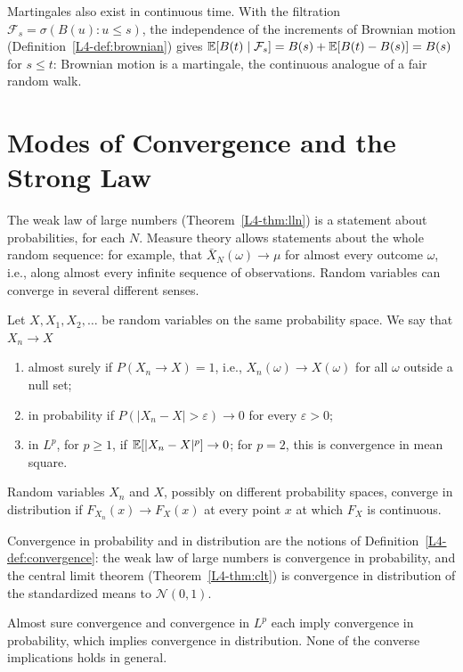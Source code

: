 Martingales also exist in continuous time. With the filtration $\mathcal{F}_s = \sigma(B(u) : u \leq s)$, the independence of the increments of Brownian motion (Definition~\ref{L4-def:brownian}) gives $\mathbb{E}[B(t) \mid \mathcal{F}_s] = B(s) + \mathbb{E}[B(t) - B(s)] = B(s)$ for $s \leq t$: Brownian motion is a martingale, the continuous analogue of a fair random walk.

\section{Modes of Convergence and the Strong Law}\label{B-sec:convergence}

The weak law of large numbers (Theorem~\ref{L4-thm:lln}) is a statement about probabilities, for each $N$. Measure theory allows statements about the whole random sequence: for example, that $\bar X_N(\omega) \to \mu$ for almost every outcome $\omega$, i.e., along almost every infinite sequence of observations. Random variables can converge in several different senses.

\begin{definition}\label{B-def:convergence-modes}
    Let $X, X_1, X_2, \ldots$ be random variables on the same probability space. We say that $X_n \to X$
    \begin{enumerate}
        \item almost surely if $P(X_n \to X) = 1$, i.e., $X_n(\omega) \to X(\omega)$ for all $\omega$ outside a null set;
        \item in probability if $P(|X_n - X| > \varepsilon) \to 0$ for every $\varepsilon > 0$;
        \item in $L^p$, for $p \geq 1$, if $\mathbb{E}[|X_n - X|^p] \to 0$; for $p = 2$, this is convergence in mean square.
    \end{enumerate}
    Random variables $X_n$ and $X$, possibly on different probability spaces, converge in distribution if $F_{X_n}(x) \to F_X(x)$ at every point $x$ at which $F_X$ is continuous.
\end{definition}

Convergence in probability and in distribution are the notions of Definition~\ref{L4-def:convergence}: the weak law of large numbers is convergence in probability, and the central limit theorem (Theorem~\ref{L4-thm:clt}) is convergence in distribution of the standardized means to $\mathcal{N}(0, 1)$.

\begin{proposition}\label{B-prop:convergence-modes}
    Almost sure convergence and convergence in $L^p$ each imply convergence in probability, which implies convergence in distribution. None of the converse implications holds in general.
\end{proposition}

